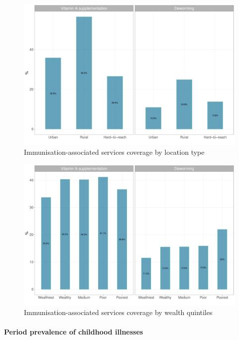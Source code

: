\documentclass[12pt,a4paper]{article}
\let\oldparagraph\paragraph
\renewcommand{\paragraph}[1]{\oldparagraph{#1}\mbox{}}
\begin{document}
\begin{figure}[H]

{\centering \includegraphics{kayinReport_files/figure-latex/epi5plot-1} 

}

\caption{Immunisation-associated services coverage by location type}\label{fig:epi5plot}
\end{figure}

\begin{figure}[H]

{\centering \includegraphics{kayinReport_files/figure-latex/epi6plot-1} 

}

\caption{Immunisation-associated services coverage by wealth quintiles}\label{fig:epi6plot}
\end{figure}

\hypertarget{illness}{%
\paragraph{Period prevalence of childhood illnesses}\label{illness}}
\end{document}
